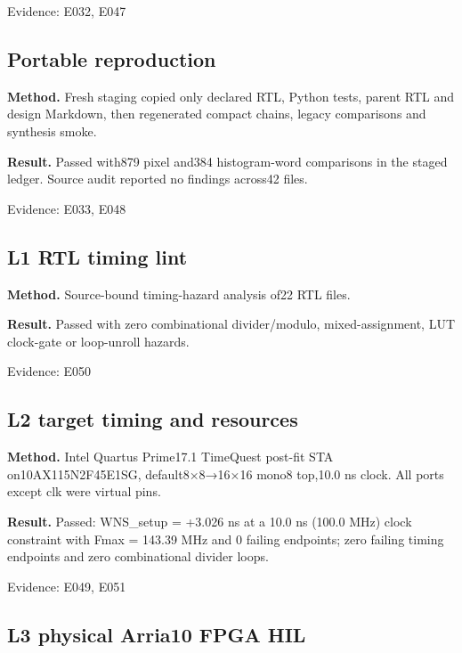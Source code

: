 \documentclass[11pt,a4paper]{article}
\begin{document}
{\small Evidence: E032,\allowbreak{} E047}

\subsection{Portable reproduction}

\textbf{Method.} Fresh staging copied only declared RTL,\allowbreak{} Python tests,\allowbreak{} parent RTL and design Markdown,\allowbreak{} then regenerated compact chains,\allowbreak{} legacy comparisons and synthesis smoke.

\textbf{Result.} Passed with879 pixel and384 histogram-word comparisons in the staged ledger. Source audit reported no findings across42 files.

{\small Evidence: E033,\allowbreak{} E048}

\subsection{L1 RTL timing lint}

\textbf{Method.} Source-bound timing-hazard analysis of22 RTL files.

\textbf{Result.} Passed with zero combinational divider/\allowbreak{}modulo,\allowbreak{} mixed-assignment,\allowbreak{} LUT clock-gate or loop-unroll hazards.

{\small Evidence: E050}

\subsection{L2 target timing and resources}

\textbf{Method.} Intel Quartus Prime17.1 TimeQuest post-fit STA on10AX115N2F45E1SG,\allowbreak{} default8{\vulcanmathsymbols ×}8{\vulcanmathsymbols →}16{\vulcanmathsymbols ×}16 mono8 top,\allowbreak{}10.0 ns clock. All ports except clk were virtual pins.

\textbf{Result.} Passed: WNS\_\allowbreak{}setup =\allowbreak{} +\allowbreak{}3.026 ns at a 10.0 ns (\allowbreak{}100.0 MHz)\allowbreak{} clock constraint with Fmax =\allowbreak{} 143.39 MHz and 0 failing endpoints; zero failing timing endpoints and zero combinational divider loops.

{\small Evidence: E049,\allowbreak{} E051}

\subsection{L3 physical Arria10 FPGA HIL}
\end{document}
